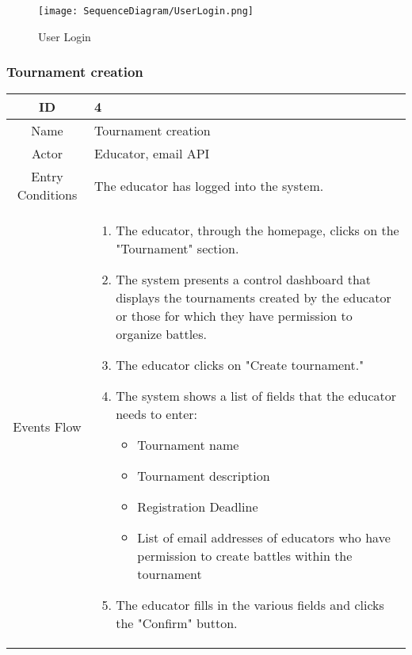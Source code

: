     \begin{figure}[H]
  \texttt{[image: SequenceDiagram/UserLogin.png]} 
  \caption{User Login}
  \label{fig:immagine}
\end{figure}

\subsubsection{Tournament creation}

\begin{longtable}{|c| p{10cm}|}
        \hline
            ID & 4 \\
        \hline
            Name & Tournament creation \\
        \hline
            Actor & Educator, email API \\
        \hline
            Entry Conditions & 
                                The educator has logged into the system.
                                \\
        \hline
            Events Flow &   \begin{enumerate}
                                \item The educator, through the homepage, clicks on the "Tournament" section.
                                \item The system presents a control dashboard that displays the tournaments created by the educator or those for which they have permission to organize battles.
                                \item The educator clicks on "Create tournament."
                                \item The system shows a list of fields that the educator needs to enter:
                                \begin{itemize}
                                    \item Tournament name
                                    \item Tournament description
                                    \item Registration Deadline
                                    \item List of email addresses of educators who have permission to create battles within the tournament
                                \end{itemize}
                                \item The educator fills in the various fields and clicks the "Confirm" button.

\end{enumerate}
\end{longtable}
